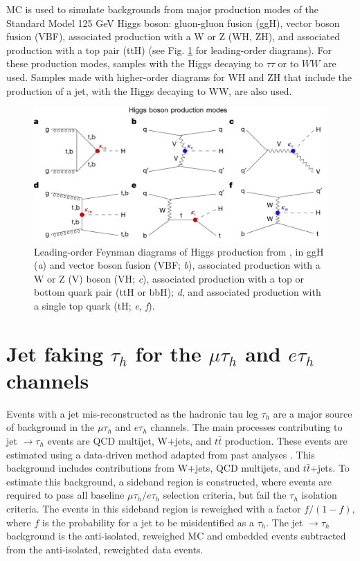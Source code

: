 MC is used to simulate backgrounds from major production modes of the Standard Model 125 GeV Higgs boson: gluon-gluon fusion (ggH), vector boson fusion (VBF), associated production with a W or Z (WH, ZH), and associated production with a top pair (ttH) (see Fig. \ref{fig:higgs-boson-production-modes} for leading-order diagrams). For these production modes, samples with the Higgs decaying to $\tau\tau$ or to $WW$ are used. Samples made with higher-order diagrams for WH and ZH that include the production of a jet, with the Higgs decaying to WW, are also used.

\begin{figure}[ht]
    \centering
    \includegraphics[width=15cm]{figures/ch-9-background-estimation/higgs-boson-production-modes.png}
    \caption[Leading-order Feynman diagrams of Higgs production.]{Leading-order Feynman diagrams of Higgs production from \cite{CMS-HIG-22-001}, in ggH (\textit{a}) and vector boson fusion (VBF; \textit{b}), associated production with a W or Z (V) boson (VH; \textit{c}), associated production with a top or bottom quark pair (ttH or bbH); \textit{d}, and associated production with a single top quark (tH; \textit{e, f}).} 

     \label{fig:higgs-boson-production-modes}
\end{figure}

\section{Jet faking $\tau_{h}$ for the $\mu\tau_{h}$ and $e\tau_{h}$ channels}
\label{section:ch-9-jet-faking-tauh-background}
Events with a jet mis-reconstructed as the hadronic tau leg $\tau_{h}$ are a major source of background in the $\mu\tau_{h}$ and $e\tau_{h}$ channels. The main processes contributing to jet $\rightarrow \tau_{h}$ events are QCD multijet, W+jets, and $t\bar{t}$ production. These events are estimated using a data-driven method adapted from past analyses \cite{CMS-HIG-19-010} \cite{CMS-HIG-17-024}. This background includes contributions from W+jets, QCD multijets, and $t\bar{t}$+jets. To estimate this background, a sideband region is constructed, where events are required to pass all baseline $\mu\tau_{h}/ e\tau_{h}$ selection criteria, but fail the $\tau_{h}$ isolation criteria. The events in this sideband region is reweighed with a factor $f/(1-f)$, where $f$ is the probability for a jet to be misidentified as a $\tau_{h}$. The jet $\rightarrow \tau_{h}$ background is the anti-isolated, reweighed MC and embedded events subtracted from the anti-isolated, reweighted data events.

